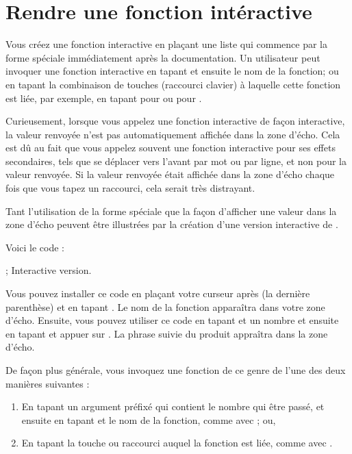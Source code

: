 \section{Rendre une fonction intéractive}

Vous créez une fonction interactive en plaçant une liste qui commence
par la forme spéciale  immédiatement après la
documentation. Un utilisateur peut invoquer une fonction interactive
en tapant  et ensuite le nom de la fonction; ou en tapant la
combinaison de touches (raccourci clavier) à laquelle cette fonction
est liée, par exemple, en tapant  pour  ou
 pour . 

Curieusement, lorsque vous appelez une fonction interactive de
façon interactive, la valeur renvoyée n'est pas automatiquement
affichée dans la zone d'écho. Cela est dû au fait que vous appelez
souvent une fonction interactive pour ses effets secondaires, tels que
se déplacer vers l'avant par mot ou par ligne, et non pour la valeur
renvoyée. Si la valeur renvoyée était affichée dans la zone d'écho
chaque fois que vous tapez un raccourci, cela serait très distrayant.

Tant l'utilisation de la forme spéciale  que la façon
d'afficher une valeur dans la zone d'écho peuvent être illustrées par
la création d'une version interactive de .

Voici le code :

   ; Interactive version.




Vous pouvez installer ce code en plaçant votre curseur après (la
dernière parenthèse) et en tapant . Le nom de la fonction
apparaîtra dans votre zone d'écho. Ensuite, vous pouvez utiliser ce
code en tapant  et un nombre et ensuite en tapant  et appuer sur \RET. La phrase  suivie du produit appraîtra dans la zone d'écho.

De façon plus générale, vous invoquez une fonction de ce genre de
l'une des deux manières suivantes :
\begin{enumerate}
\item En tapant un argument préfixé qui contient le nombre qui être
  passé, et ensuite en tapant  et le nom de la fonction, comme
  avec ; ou,
\item En tapant la touche ou raccourci auquel la fonction est liée,
  comme avec .
\end{enumerate}

